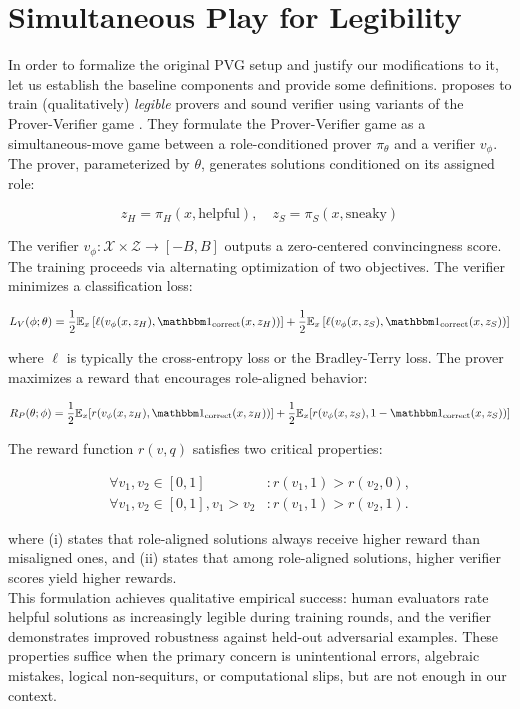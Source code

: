 \section{Simultaneous Play for Legibility}
In order to formalize the original PVG setup and justify our modifications to it, let us establish the baseline components and provide some definitions. \citet{kirchner2024prover} proposes to train (qualitatively) \textit{legible} provers and sound verifier using variants of the Prover-Verifier game \citep{anil2021learning}. They formulate the Prover-Verifier game as a simultaneous-move game between a role-conditioned prover $\pi_\theta$ and a verifier $v_\phi$. The prover, parameterized by $\theta$, generates solutions conditioned on its assigned role:

$$z_H = \pi_H(x, \text{helpful}), \quad z_S = \pi_S(x, \text{sneaky})$$

The verifier $v_\phi: \mathcal{X} \times \mathcal{Z} \to [-B, B]$ outputs a zero-centered convincingness score. The training proceeds via alternating optimization of two objectives. The verifier minimizes a classification loss:

$$L_V(\phi; \theta) = \frac{1}{2}\mathbb{E}_x\left[\ell(v_\phi(x, z_H), \corr(x, z_H))\right] + \frac{1}{2}\mathbb{E}_x\left[\ell(v_\phi(x, z_S), \corr(x, z_S))\right]$$

where $\ell$ is typically the cross-entropy loss or the Bradley-Terry loss. The prover maximizes a reward that encourages role-aligned behavior:

$$R_P(\theta; \phi) = \frac{1}{2}\mathbb{E}_x[r(v_\phi(x, z_H), \corr(x, z_H))] + \frac{1}{2}\mathbb{E}_x[r(v_\phi(x, z_S), 1 - \corr(x, z_S))]$$

The reward function $r(v, q)$ satisfies two critical properties:

\[\begin{aligned} \forall v_1, v_2 \in [0, 1] &: r(v_1, 1) > r(v_2, 0), \\ \forall v_1, v_2 \in [0, 1], v_1 > v_2 &: r(v_1, 1) > r(v_2, 1). \end{aligned}\]

\noindent where (i) states that role-aligned solutions always receive higher reward than misaligned ones, and (ii) states that among role-aligned solutions, higher verifier scores yield higher rewards.
\\
This formulation achieves qualitative empirical success: human evaluators rate helpful solutions as increasingly legible during training rounds, and the verifier demonstrates improved robustness against held-out adversarial examples. These properties suffice when the primary concern is unintentional errors, algebraic mistakes, logical non-sequiturs, or computational slips, but are not enough in our context.

